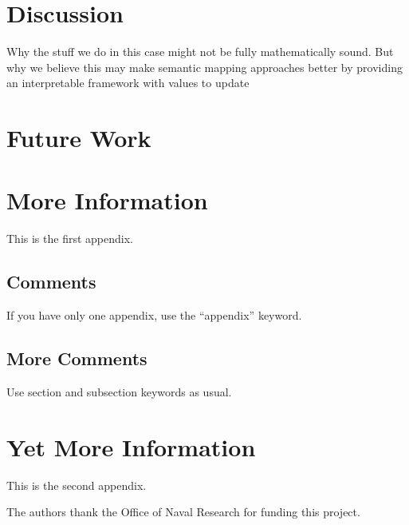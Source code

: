 \documentclass[twocolumn,letterpaper]{IEEEAerospaceCLS}  %
\begin{document}
\section{Discussion} \label{sec:Disc}
Why the stuff we do in this case might not be fully mathematically sound. But why we believe this may make semantic mapping approaches better by providing an interpretable framework with values to update 
\section{Future Work} \label{sec:Fut}
\appendices{}              %

\section{More Information}        %
This is the first appendix. 

\subsection{Comments}
If you have only one appendix, use the ``appendix'' keyword.

\subsection{More Comments}
Use section and subsection keywords as usual.

\section{Yet More Information}    %
This is the second appendix.



\acknowledgments
The authors thank the Office of Naval Research for funding this project.
\end{document}
